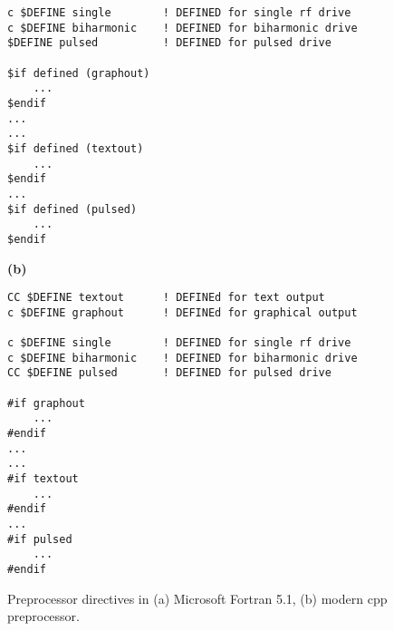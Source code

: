 \begin{supplement}
\begin{figure}[h]
\begin{minipage}{0.75\textwidth}
\begin{lstlisting}
c $DEFINE single        ! DEFINED for single rf drive
c $DEFINE biharmonic    ! DEFINED for biharmonic drive
$DEFINE pulsed			! DEFINED for pulsed drive

$if defined (graphout)
	...
$endif
...
...
$if defined (textout)
	...
$endif
...
$if defined (pulsed)
	...
$endif
\end{lstlisting}
\end{minipage}
%
\hfill
%
\begin{minipage}{0.75\textwidth}
\textbf{(b)}
\begin{lstlisting}
CC $DEFINE textout		! DEFINEd for text output
c $DEFINE graphout		! DEFINEd for graphical output

c $DEFINE single        ! DEFINED for single rf drive
c $DEFINE biharmonic    ! DEFINED for biharmonic drive
CC $DEFINE pulsed		! DEFINED for pulsed drive

#if graphout
	...
#endif
...
...
#if textout
	...
#endif
...
#if pulsed
	...
#endif
\end{lstlisting}
\end{minipage}

\caption{Preprocessor directives in (a) Microsoft Fortran 5.1, (b) modern \textsf{cpp} preprocessor.}
\label{fig:preprocessor}
\end{figure}


\end{supplement}

